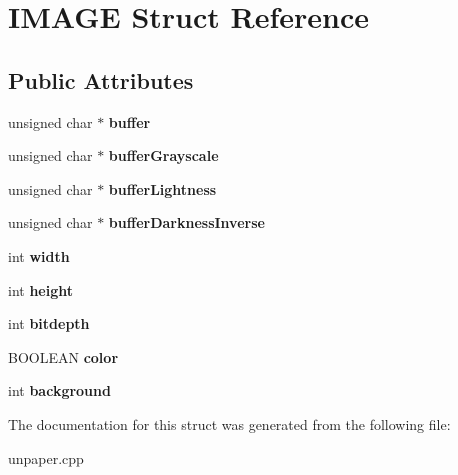 \hypertarget{struct_i_m_a_g_e}{\section{I\-M\-A\-G\-E Struct Reference}
\label{struct_i_m_a_g_e}
}
\subsection*{Public Attributes}
\begin{DoxyCompactItemize}
\item 
\hypertarget{struct_i_m_a_g_e_a30e3996ab0c3da7f9d1e3a4485fb2a5d}{unsigned char $\ast$ {\bfseries buffer}}\label{struct_i_m_a_g_e_a30e3996ab0c3da7f9d1e3a4485fb2a5d}

\item 
\hypertarget{struct_i_m_a_g_e_aa1b2a0dab02a94f874d2c6553e791664}{unsigned char $\ast$ {\bfseries buffer\-Grayscale}}\label{struct_i_m_a_g_e_aa1b2a0dab02a94f874d2c6553e791664}

\item 
\hypertarget{struct_i_m_a_g_e_a1da0dfcee46bb2279b2e424b23effbe6}{unsigned char $\ast$ {\bfseries buffer\-Lightness}}\label{struct_i_m_a_g_e_a1da0dfcee46bb2279b2e424b23effbe6}

\item 
\hypertarget{struct_i_m_a_g_e_acd018a0b883df57e2e029da961b7a144}{unsigned char $\ast$ {\bfseries buffer\-Darkness\-Inverse}}\label{struct_i_m_a_g_e_acd018a0b883df57e2e029da961b7a144}

\item 
\hypertarget{struct_i_m_a_g_e_a96dd3f56150623a22595d9f45f46ae2a}{int {\bfseries width}}\label{struct_i_m_a_g_e_a96dd3f56150623a22595d9f45f46ae2a}

\item 
\hypertarget{struct_i_m_a_g_e_a8d0429b73019627794dbdf18a0cc1643}{int {\bfseries height}}\label{struct_i_m_a_g_e_a8d0429b73019627794dbdf18a0cc1643}

\item 
\hypertarget{struct_i_m_a_g_e_acd13d737a785ca636fdda1d139b6c684}{int {\bfseries bitdepth}}\label{struct_i_m_a_g_e_acd13d737a785ca636fdda1d139b6c684}

\item 
\hypertarget{struct_i_m_a_g_e_a5693e2abd3ce20b79513020baf581871}{B\-O\-O\-L\-E\-A\-N {\bfseries color}}\label{struct_i_m_a_g_e_a5693e2abd3ce20b79513020baf581871}

\item 
\hypertarget{struct_i_m_a_g_e_a7224eac9b80e30c0f7f3d2509e9177c5}{int {\bfseries background}}\label{struct_i_m_a_g_e_a7224eac9b80e30c0f7f3d2509e9177c5}

\end{DoxyCompactItemize}


The documentation for this struct was generated from the following file\-:\begin{DoxyCompactItemize}
\item 
unpaper.\-cpp\end{DoxyCompactItemize}
